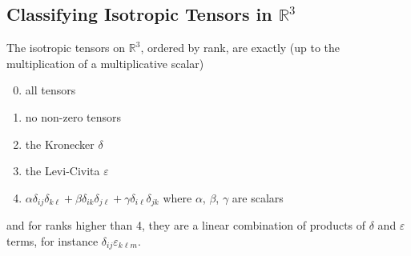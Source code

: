 \documentclass{article}
\begin{document}
\subsection{Classifying Isotropic Tensors in $\mathbb R^3$}
\begin{proposition}
	The isotropic tensors on $\mathbb R^3$, ordered by rank, are exactly (up to the multiplication of a multiplicative scalar)
	\begin{enumerate}[{Rank} 1:]
		\setcounter{enumi}{-1}
		\item all tensors
		\item no non-zero tensors
		\item the Kronecker $\delta$
		\item the Levi-Civita $\varepsilon$
		\item $\alpha \delta_{ij} \delta_{k\ell} + \beta \delta_{ik} \delta_{j\ell} + \gamma \delta_{i\ell} \delta_{jk}$ where $\alpha$, $\beta$, $\gamma$ are scalars
	\end{enumerate}
	and for ranks higher than 4, they are a linear combination of products of $\delta$ and $\varepsilon$ terms, for instance $\delta_{ij}\varepsilon_{k\ell m}$.
\end{proposition}
\end{document}
